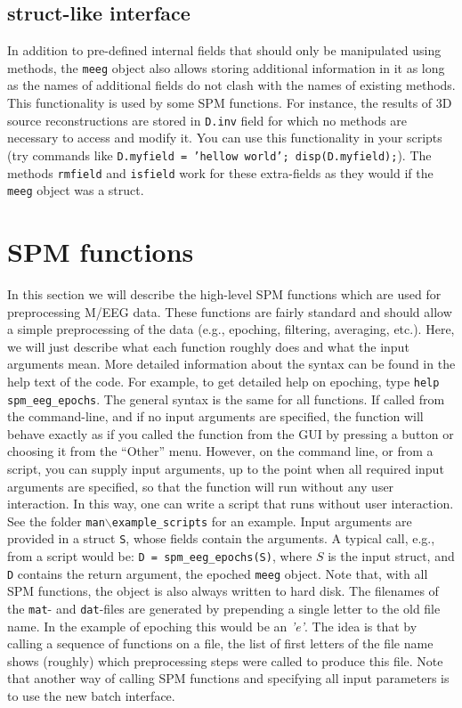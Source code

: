 \subsection{struct-like interface}
In addition to pre-defined internal fields that should only be manipulated using methods, the \texttt{meeg} object also allows storing additional information in it as long as the names of additional fields do not clash with the names of existing methods. This functionality is used by some SPM functions. For instance, the results of 3D source reconstructions are stored in \texttt{D.inv} field for which no methods are necessary to access and modify it. You can use this functionality in your scripts (try commands like \texttt{D.myfield = 'hellow world'; disp(D.myfield);}). The methods \texttt{rmfield} and \texttt{isfield} work for these extra-fields as they would if the \texttt{meeg} object was a struct.

\section{SPM functions}
In this section we will describe the high-level SPM functions which are used for preprocessing M/EEG data. These functions are fairly standard and should allow a simple preprocessing of the data (e.g., epoching, filtering, averaging, etc.). Here, we will just describe what each function roughly does and what the input arguments mean. More detailed information about the syntax can be found in the help text of the code. For example, to get detailed help on epoching, type \texttt{help spm\_eeg\_epochs}. The general syntax is the same for all functions. If called from the command-line, and if no input arguments are specified, the function will behave exactly as if you called the function from the GUI by pressing a button or choosing it from the ``Other'' menu. However, on the command line, or from a script, you can supply input arguments, up to the point when all required input arguments are specified, so that the function will run without any user interaction. In this way, one can write a script that runs without user interaction. See the folder \texttt{man$\backslash$example\_scripts} for an example. Input arguments are provided in a struct \texttt{S}, whose fields contain the arguments. A typical call, e.g., from a script would be: \texttt{D = spm\_eeg\_epochs(S)}, where $S$ is the input struct, and \texttt{D} contains the return argument, the epoched \texttt{meeg} object. Note that, with all SPM functions, the object is also always written to hard disk. The filenames of the \texttt{mat}- and \texttt{dat}-files are generated by prepending a single letter to the old file name. In the example of epoching this would be an \textit{'e'}. The idea is that by calling a sequence of functions on a file, the list of first letters of the file name shows (roughly) which preprocessing steps were called to produce this file. Note that another way of calling SPM functions and specifying all input parameters is to use the new batch interface.

